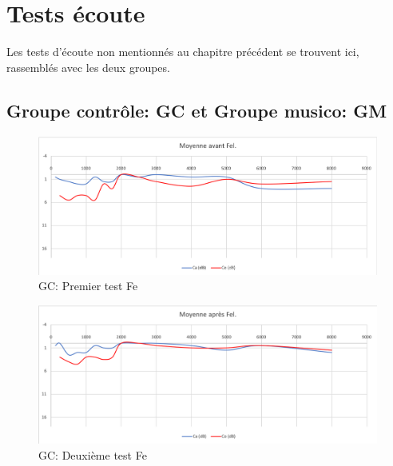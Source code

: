 \chapter{Tests écoute }

Les  tests d'écoute non mentionnés au chapitre précédent se trouvent ici, rassemblés 
avec les deux groupes.
 \section{Groupe contrôle: GC  et Groupe musico: GM}
 
  \begin{figure}[th]
 	\centering
 	\includegraphics[width=1\linewidth]{images/graphiques/moyavFEL.png}
 	\caption[Patient Fe: 1° test]{GC: Premier test Fe}
 	\label{fig:moyavfel}
 \end{figure}
 \begin{figure}[th]
 	\centering
 	\includegraphics[width=1\linewidth]{images/graphiques/moyaprFEL.png}
 	\caption[Patient Fe: 2° test]{GC: Deuxième test Fe}
 	\label{fig:moyavfel}
 \end{figure}
 
 
 

